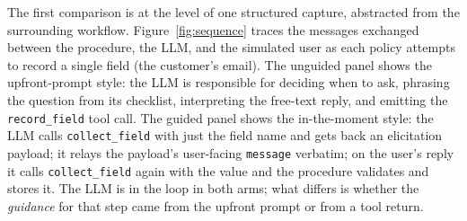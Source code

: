 \documentclass[11pt,a4paper]{article}
\begin{document}
The first comparison is at the level of one structured capture, abstracted from the surrounding workflow. Figure~\ref{fig:sequence} traces the messages exchanged between the procedure, the LLM, and the simulated user as each policy attempts to record a single field (the customer's email). The unguided panel shows the upfront-prompt style: the LLM is responsible for deciding when to ask, phrasing the question from its checklist, interpreting the free-text reply, and emitting the \texttt{record\_field} tool call. The guided panel shows the in-the-moment style: the LLM calls \texttt{collect\_field} with just the field name and gets back an elicitation payload; it relays the payload's user-facing \texttt{message} verbatim; on the user's reply it calls \texttt{collect\_field} again with the value and the procedure validates and stores it. The LLM is in the loop in both arms; what differs is whether the \emph{guidance} for that step came from the upfront prompt or from a tool return.
\end{document}
